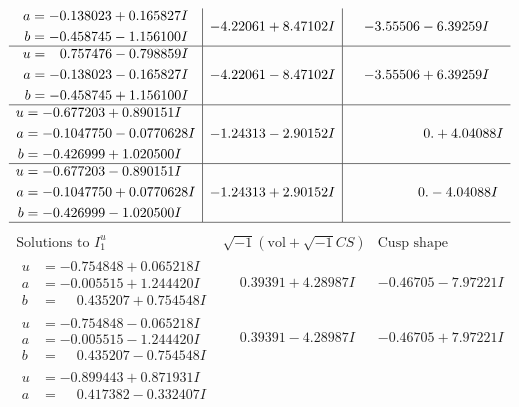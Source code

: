 \documentclass[1p]{elsarticle_modified}
\theoremstyle{definition}
\newcommand{\I}{\sqrt{-1}}
\begin{document}
$$\begin{array}{c|c|c}
\begin{aligned}
a &= -0.138023 + 0.165827 I \\
b &= -0.458745 - 1.156100 I\end{aligned}
 & -4.22061 + 8.47102 I & -3.55506 - 6.39259 I \\ \hline\begin{aligned}
u &= \phantom{-}0.757476 - 0.798859 I \\
a &= -0.138023 - 0.165827 I \\
b &= -0.458745 + 1.156100 I\end{aligned}
 & -4.22061 - 8.47102 I & -3.55506 + 6.39259 I \\ \hline\begin{aligned}
u &= -0.677203 + 0.890151 I \\
a &= -0.1047750 - 0.0770628 I \\
b &= -0.426999 + 1.020500 I\end{aligned}
 & -1.24313 - 2.90152 I & \phantom{-0.000000 -}0. + 4.04088 I \\ \hline\begin{aligned}
u &= -0.677203 - 0.890151 I \\
a &= -0.1047750 + 0.0770628 I \\
b &= -0.426999 - 1.020500 I\end{aligned}
 & -1.24313 + 2.90152 I & \phantom{-0.000000 } 0. - 4.04088 I\\
 \hline 
 \end{array}$$\newpage$$\begin{array}{c|c|c}  
\text{Solutions to }I^u_{1}& \I (\text{vol} + \sqrt{-1}CS) & \text{Cusp shape}\\
 \hline 
\begin{aligned}
u &= -0.754848 + 0.065218 I \\
a &= -0.005515 + 1.244420 I \\
b &= \phantom{-}0.435207 + 0.754548 I\end{aligned}
 & \phantom{-}0.39391 + 4.28987 I & -0.46705 - 7.97221 I \\ \hline\begin{aligned}
u &= -0.754848 - 0.065218 I \\
a &= -0.005515 - 1.244420 I \\
b &= \phantom{-}0.435207 - 0.754548 I\end{aligned}
 & \phantom{-}0.39391 - 4.28987 I & -0.46705 + 7.97221 I \\ \hline\begin{aligned}
u &= -0.899443 + 0.871931 I \\
a &= \phantom{-}0.417382 - 0.332407 I \\

\end{aligned}
\end{array}$$
\end{document}
